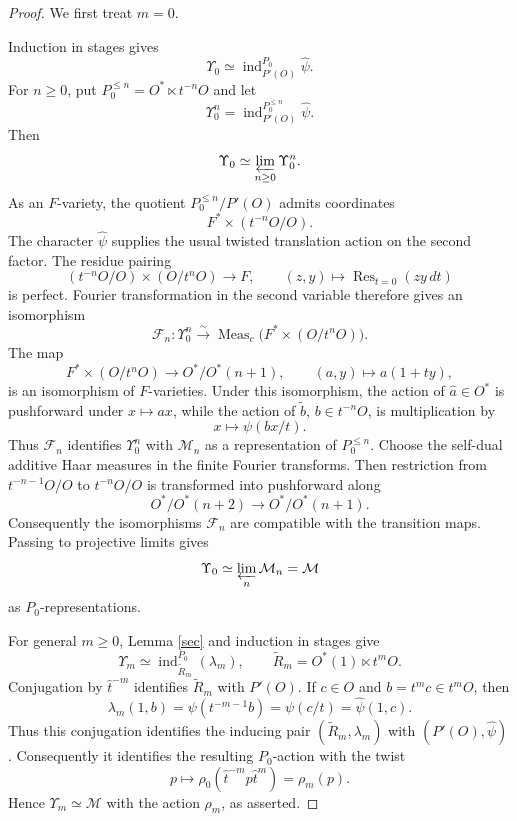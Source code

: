 \documentclass[10pt,a4paper]{amsart}
\newcommand{\bl}{\lambda}
\newcommand{\ind}{\operatorname{ind}}
\newcommand{\mcM}{\mathcal M}
\newcommand{\sms}{\smallskip}
\begin{document}
\begin{proof}
We first treat $m=0$.

\sms

Induction in stages gives
$$
\Upsilon_0\simeq\ind_{P'(O)}^{P_0}\widehat\psi.
$$
For $n\geq0$, put $P_0^{\leq n}=O^*\ltimes t^{-n}O$ and let
$$
\Upsilon_0^n=\ind_{P'(O)}^{P_0^{\leq n}}\widehat\psi.
$$
Then
$$
\Upsilon_0\simeq\varprojlim_{n\geq0}\Upsilon_0^n.
$$
As an $F$-variety, the quotient $P_0^{\leq n}/P'(O)$ admits coordinates
$$
F^*\times(t^{-n}O/O).
$$
The character $\widehat\psi$ supplies the usual twisted translation action on the second factor. The residue pairing
$$
(t^{-n}O/O)\times(O/t^nO)\longrightarrow F,\qquad
(z,y)\longmapsto\operatorname{Res}_{t=0}(zy\,dt)
$$
is perfect. Fourier transformation in the second variable therefore gives an isomorphism
$$
\mathcal F_n:\Upsilon_0^n\stackrel{\sim}{\longrightarrow}
\operatorname{Meas}_c\bigl(F^*\times(O/t^nO)\bigr).
$$
The map
$$
F^*\times(O/t^nO)\longrightarrow O^*/O^*(n+1),\qquad
(a,y)\longmapsto a(1+ty),
$$
is an isomorphism of $F$-varieties. Under this isomorphism, the action of $\widehat a\in O^*$ is pushforward under $x\mapsto ax$, while the action of $\widetilde b$, $b\in t^{-n}O$, is multiplication by
$$
x\longmapsto\psi(bx/t).
$$
Thus $\mathcal F_n$ identifies $\Upsilon_0^n$ with $\mcM_n$ as a representation of $P_0^{\leq n}$.
Choose the self-dual additive Haar measures in the finite Fourier transforms. Then restriction from $t^{-n-1}O/O$ to $t^{-n}O/O$ is transformed into pushforward along
$$
O^*/O^*(n+2)\longrightarrow O^*/O^*(n+1).
$$
Consequently the isomorphisms $\mathcal F_n$ are compatible with the transition maps. Passing to projective limits gives
$$
\Upsilon_0\simeq\varprojlim_n\mcM_n=\mcM
$$
as $P_0$-representations.

For general $m\geq0$, Lemma \ref{sec} and induction in stages give
$$
\Upsilon_m\simeq\ind_{\widetilde R_m}^{P_0}(\bl_m),
\qquad \widetilde R_m=O^*(1)\ltimes t^mO.
$$
Conjugation by $\widehat t^{-m}$ identifies $\widetilde R_m$ with $P'(O)$. If $c\in O$ and $b=t^mc\in t^mO$, then
$$
\bl_m(1,b)=\psi(t^{-m-1}b)=\psi(c/t)=\widehat\psi(1,c).
$$
Thus this conjugation identifies the inducing pair $(\widetilde R_m,\bl_m)$ with $(P'(O),\widehat\psi)$. Consequently it identifies the resulting $P_0$-action with the twist
$$
p\longmapsto\rho_0(\widehat t^{-m}p\widehat t^m)=\rho_m(p).
$$
Hence $\Upsilon_m\simeq\mcM$ with the action $\rho_m$, as asserted.
\end{proof}
\end{document}
